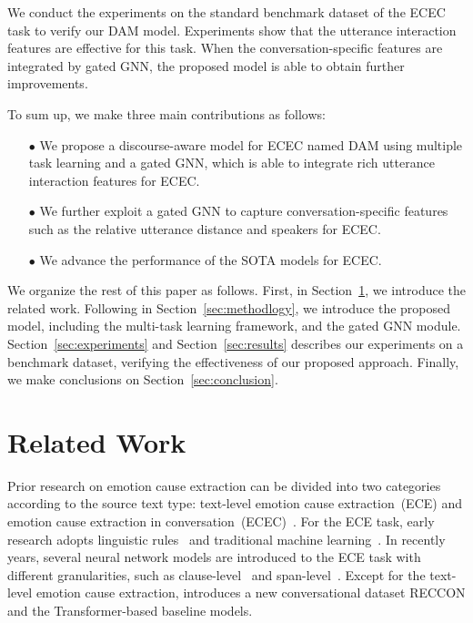 \documentclass[11pt]{article}
\begin{document}
We conduct the experiments on the standard benchmark dataset of the ECEC task to verify our DAM model.
Experiments show that the utterance interaction features are effective for this task.
When the conversation-specific features are integrated by gated GNN,
the proposed model is able to obtain further improvements.

To sum up, we make three main contributions as follows:
\begin{itemize}
\item[$\bullet$] We propose a discourse-aware model for ECEC named DAM using multiple task learning and a gated GNN,
which is able to integrate rich utterance interaction features for ECEC.
\item[$\bullet$] We further exploit a gated GNN to capture conversation-specific features such as the relative utterance distance and speakers for ECEC.
\item[$\bullet$] We advance the performance of the SOTA models for ECEC.
\end{itemize}

We organize the rest of this paper as follows.
First, in Section~\ref{sec:related work}, we introduce the related work.
Following in Section~\ref{sec:methodlogy}, we introduce the proposed model, including the multi-task learning framework, and the gated GNN module.
Section~\ref{sec:experiments} and Section~\ref{sec:results} describes our experiments on a benchmark dataset, verifying the effectiveness of our proposed approach.
Finally, we make conclusions on Section~\ref{sec:conclusion}.

\section{Related Work}\label{sec:related work}
Prior research on emotion cause extraction can be divided into two categories according to the source text type: text-level emotion cause extraction~(ECE) and emotion cause extraction in conversation~(ECEC)~\cite{poria2021recognizing}.
For the ECE task, early research adopts linguistic rules~\cite{lee2010text,chen2010emotion,russo2011emocause} and traditional machine learning~\cite{gui2014emotion,gui2016emotion,gui2018event,xuEnsembleApproachEmotion2017}.
In recently years, several neural network models are introduced to the ECE task with different granularities, such as clause-level~\cite{diaoMultigranularityBidirectionalAttention2020,dingExperimentalStudyEffects2020,huBidirectionalHierarchicalAttention2021} and span-level~\cite{liBoundaryDetectionBERT2021a,liSpanLevelEmotionCause2021a,qianMultiTaskMRCFramework2021,turcanMultiTaskLearningAdapted2021a,liSpanlevelEmotionCause2021}.
Except for the text-level emotion cause extraction, \citet{poria2021recognizing} introduces a new conversational dataset RECCON and the Transformer-based baseline models. 
\end{document}
